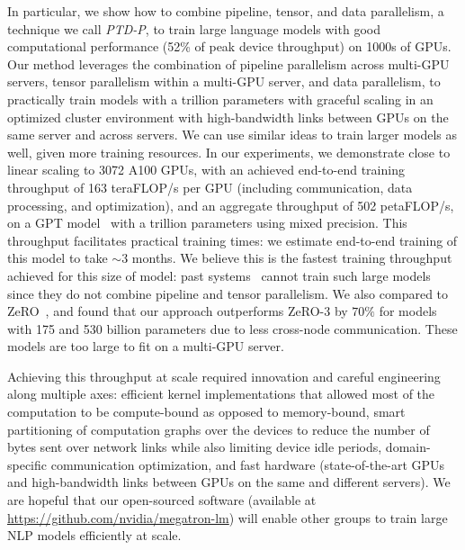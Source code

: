 \documentclass[sigconf,nonacm]{acmart}
\begin{document}
In particular, we show how to combine pipeline, tensor, and data parallelism, a technique we call \emph{PTD-P}, to train large language models with good computational performance (52\% of peak device throughput) on 1000s of GPUs. Our method leverages the combination of pipeline parallelism across multi-GPU servers, tensor parallelism within a multi-GPU server, and data parallelism, to practically train models with a trillion parameters with graceful scaling in an optimized cluster environment with high-bandwidth links between GPUs on the same server and across servers. We can use similar ideas to train larger models as well, given more training resources. In our experiments, we demonstrate close to linear scaling to 3072 A100 GPUs, with an achieved end-to-end training throughput of 163 teraFLOP/s per GPU (including communication, data processing, and optimization), and an aggregate throughput of 502 petaFLOP/s, on a GPT model~\cite{gpt3} with a trillion parameters using mixed precision. This throughput facilitates practical training times: we estimate end-to-end training of this model to take $\sim 3$ months. We believe this is the fastest training throughput achieved for this size of model: past systems~\cite{shoeybi2019megatron, narayanan2019pipedream} cannot train such large models since they do not combine pipeline and tensor parallelism. We also compared to ZeRO~\cite{rajbhandari2019zero}, and found that our approach outperforms ZeRO-3 by $70\%$ for models with 175 and 530 billion parameters due to less cross-node communication. These models are too large to fit on a multi-GPU server.

Achieving this throughput at scale required innovation and careful engineering along multiple axes: efficient kernel implementations that allowed most of the computation to be compute-bound as opposed to memory-bound, smart partitioning of computation graphs over the devices to reduce the number of bytes sent over network links while also limiting device idle periods, domain-specific communication optimization, and fast hardware (state-of-the-art GPUs and high-bandwidth links between GPUs on the same and different servers). We are hopeful that our open-sourced software (available at \url{https://github.com/nvidia/megatron-lm}) will enable other groups to train large NLP models efficiently at scale. 
\end{document}
